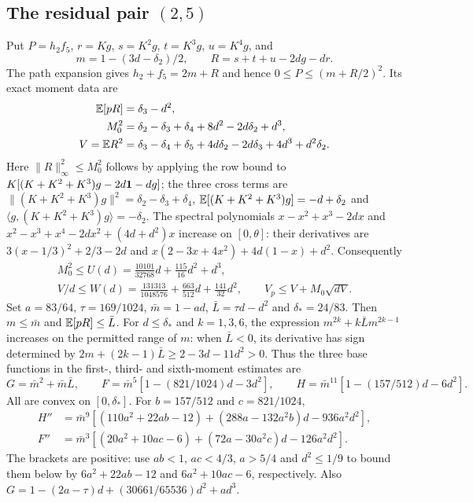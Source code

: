 \subsection[The residual pair (2,5)]{The residual pair $(2,5)$}\label{loc:S4}
Put $P=h_2f_5$, $r=Kg$, $s=K^2g$, $t=K^3g$, $u=K^4g$, and
\[
 m=1-(3d-\delta_{2})/2,\qquad R=s+t+u-2dg-dr.
\]
The path expansion gives $h_2+f_5=2m+R$ and hence
$0\le P\le(m+R/2)^2$. Its exact moment data are
\begin{align*}
 \mathbb E[pR]&=\delta_{3}-d^2,\\
 M_0^2&=\delta_{2}-\delta_{3}+\delta_{4}+8d^2-2d\delta_{2}+d^3,\\
 V=\mathbb E R^2&=\delta_{3}-\delta_{4}+\delta_{5}+4d\delta_{2}-2d\delta_{3}+4d^3+d^2\delta_{2}.
\end{align*}
Here $\|R\|_\infty^2\le M_0^2$ follows by applying the row bound to
$K[(K+K^2+K^3)g-2d\mathbf1-dg]$; the three cross terms are
$\|(K+K^2+K^3)g\|^2=\delta_{2}-\delta_{3}+\delta_{4}$,
$\mathbb E[(K+K^2+K^3)g]=-d+\delta_{2}$ and
$\langle g,(K+K^2+K^3)g\rangle=-\delta_{2}$.
The spectral polynomials
$x-x^2+x^3-2dx$ and
$x^2-x^3+x^4-2dx^2+(4d+d^2)x$ increase on $[0,\theta]$:
their derivatives are $3(x-1/3)^2+2/3-2d$ and
$x(2-3x+4x^2)+4d(1-x)+d^2$. Consequently
\[
 \begin{gathered}
 M_0^2\le U(d)=\frac{10101}{32768}d+\frac{115}{16}d^2+d^3,\\
 V/d\le W(d)=\frac{131313}{1048576}+\frac{663}{512}d+
                  \frac{141}{32}d^2,\qquad
 V_p\le V+M_0\sqrt{dV}.
 \end{gathered}
\]
Set $a=83/64$, $\tau=169/1024$, $\bar m=1-ad$,
$\bar L=\tau d-d^2$ and $\delta_{*}=24/83$.
Then $m\le\bar m$ and $\mathbb E[pR]\le\bar L$.
For $d\le \delta_{*}$ and $k=1,3,6$, the expression
$m^{2k}+k\bar Lm^{2k-1}$ increases on the permitted range of $m$:
when $\bar L<0$, its derivative has sign determined by
$2m+(2k-1)\bar L\ge2-3d-11d^2>0$.
Thus the three base functions in the first-, third- and sixth-moment
estimates are
\[
 G=\bar m^2+\bar m\bar L,\qquad
 F=\bar m^5[1-(821/1024)d-3d^2],\qquad
 H=\bar m^{11}[1-(157/512)d-6d^2].
\]
All are convex on $[0,\delta_{*}]$. For $b=157/512$ and $c=821/1024$,
\begin{align*}
 H''&=\bar m^9[(110a^2+22ab-12)+(288a-132a^2b)d-936a^2d^2],\\
 F''&=\bar m^3[(20a^2+10ac-6)+(72a-30a^2c)d-126a^2d^2].
\end{align*}
The brackets are positive: use $ab<1$, $ac<4/3$, $a>5/4$ and
$d^2\le1/9$ to bound them below by $6a^2+22ab-12$ and
$6a^2+10ac-6$, respectively. Also
$G=1-(2a-\tau)d+(30661/65536)d^2+ad^3$.

